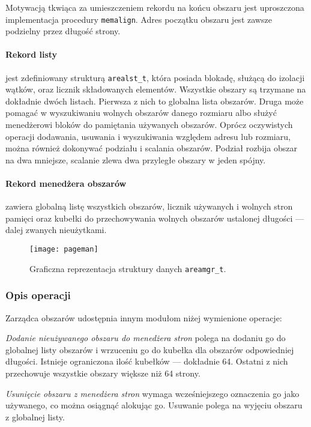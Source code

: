 \documentclass[12pt,a4paper,titlepage,twoside]{mwart}
\begin{document}
Motywacją tkwiąca za umieszczeniem rekordu na końcu obszaru jest uproszczona
implementacja procedury \texttt{memalign}. Adres początku obszaru jest zawsze
podzielny przez długość strony. 

\paragraph{Rekord listy} jest zdefiniowany strukturą \verb+arealst_t+, która
posiada blokadę, służącą do izolacji wątków, oraz licznik składowanych
elementów. Wszystkie obszary są trzymane na dokładnie dwóch listach. Pierwsza z
nich to globalna lista obszarów. Druga może pomagać w wyszukiwaniu wolnych
obszarów danego rozmiaru albo służyć menedżerowi bloków do pamiętania używanych
obszarów. Oprócz oczywistych operacji dodawania, usuwania i wyszukiwania
względem adresu lub rozmiaru, można również dokonywać podziału i scalania
obszarów. Podział rozbija obszar na dwa mniejsze, scalanie zlewa dwa przyległe
obszary w jeden spójny.

\paragraph{Rekord menedżera obszarów} zawiera globalną listę wszystkich
obszarów, licznik używanych i wolnych stron pamięci oraz kubełki do
przechowywania wolnych obszarów ustalonej długości --- dalej zwanych
nieużytkami.

\begin{figure}[h]
\centering
\texttt{[image: pageman]}
\caption{Graficzna reprezentacja struktury danych \texttt{areamgr\_t}.}
\end{figure}

\subsubsection{Opis operacji}

Zarządca obszarów udostępnia innym modułom niżej wymienione operacje:

\textit{Dodanie nieużywanego obszaru do menedżera stron} polega na dodaniu go do
globalnej listy obszarów i wrzuceniu go do kubełka dla obszarów odpowiedniej
długości. Istnieje ograniczona ilość kubełków --- dokładnie 64. Ostatni z nich
przechowuje wszystkie obszary większe niż 64 strony.

\textit{Usunięcie obszaru z menedżera stron} wymaga wcześniejszego oznaczenia
go jako używanego, co można osiągnąć alokując go.  Usuwanie polega na wyjęciu
obszaru z globalnej listy.
\end{document}
